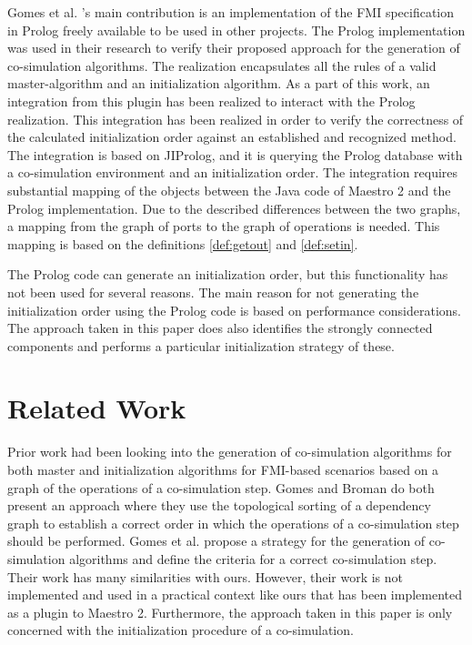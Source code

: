 \documentclass[runningheads]{llncs}
\begin{document}
Gomes et al. 's main contribution is an implementation of the FMI specification in Prolog freely available to be used in other projects. The Prolog implementation was used in their research to verify their proposed approach for the generation of co-simulation algorithms. The realization encapsulates all the rules of a valid master-algorithm and an initialization algorithm. As a part of this work, an integration from this plugin has been realized to interact with the Prolog realization. This integration has been realized in order to verify the correctness of the calculated initialization order against an established and recognized method. The integration is based on JIProlog\cite{}, and it is querying the Prolog database with a co-simulation environment and an initialization order. The integration requires substantial mapping of the objects between the Java code of Maestro 2 and the Prolog implementation. Due to the described differences between the two graphs, a mapping from the graph of ports to the graph of operations is needed. This mapping is based on the definitions \ref{def:getout} and \ref{def:setin}.

The Prolog code can generate an initialization order, but this functionality has not been used for several reasons. The main reason for not generating the initialization order using the Prolog code is based on performance considerations. The approach taken in this paper does also identifies the strongly connected components and performs a particular initialization strategy of these.

\section{Related Work}
Prior work \cite{Gomes2019, BromanCompositionCo-Simulation} had been looking into the generation of co-simulation algorithms for both master and initialization algorithms for FMI-based scenarios based on a graph of the operations of a co-simulation step. Gomes and Broman do both present an approach where they use the topological sorting of a dependency graph to establish a correct order in which the operations of a co-simulation step should be performed. 
Gomes et al. \cite{Gomes2019} propose a strategy for the generation of co-simulation algorithms and define the criteria for a correct co-simulation step.  Their work has many similarities with ours. However, their work is not implemented and used in a practical context like ours that has been implemented as a plugin to Maestro 2. Furthermore, the approach taken in this paper is only concerned with the initialization procedure of a co-simulation.
\end{document}
